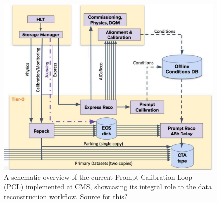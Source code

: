 




\begin{figure}[h!]	
\centering
\includegraphics[width=\textwidth]{figures/PCL.jpg} %
\caption{A schematic overview of the current Prompt Calibration Loop (PCL) implemented at CMS, showcasing its integral role to the data reconstruction workflow. Source for this?}
\label{fig:PCL}
\end{figure}


